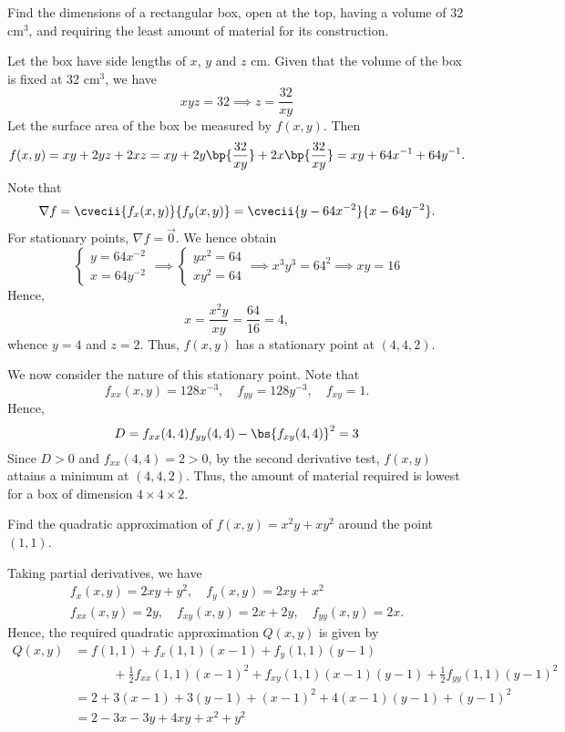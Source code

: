 \begin{problem}
    Find the dimensions of a rectangular box, open at the top, having a volume of 32 cm$^3$, and requiring the least amount of material for its construction.
\end{problem}
\begin{solution}
    Let the box have side lengths of $x$, $y$ and $z$ cm. Given that the volume of the box is fixed at 32 cm$^3$, we have \[xyz = 32 \implies z = \frac{32}{xy}\] Let the surface area of the box be measured by $f(x, y)$. Then \[f(x, y) = xy + 2yz + 2xz = xy + 2y\bp{\frac{32}{xy}} + 2x\bp{\frac{32}{xy}} = xy + 64x^{-1} + 64y^{-1}.\] Note that \[\nabla f = \cvecii{f_x(x, y)}{f_y(x, y)} = \cvecii{y-64x^{-2}}{x - 64y^{-2}}.\] For stationary points, $\nabla f = \vec 0$. We hence obtain
    \[
        \begin{cases}
            y = 64x^{-2}\\
            x = 64y^{-2}
        \end{cases} \implies
        \begin{cases}
            yx^2 = 64\\
            xy^2 = 64
        \end{cases}
        \implies x^3y^3 = 64^2 \implies xy = 16
    \]
    Hence, \[x = \frac{x^2y}{xy} = \frac{64}{16} = 4,\] whence $y = 4$ and $z = 2$. Thus, $f(x, y)$ has a stationary point at $(4, 4, 2)$. 
    
    We now consider the nature of this stationary point. Note that \[f_{xx}(x, y) = 128x^{-3}, \quad f_{yy} = 128y^{-3},\quad f_{xy} = 1.\] Hence, \[D = f_{xx}(4, 4)f_{yy}(4, 4) - \bs{f_{xy}(4, 4)}^2 = 3\] Since $D > 0$ and $f_{xx}(4, 4) = 2 > 0$, by the second derivative test, $f(x, y)$ attains a minimum at $(4, 4, 2)$. Thus, the amount of material required is lowest for a box of dimension $4 \times 4 \times 2$.
\end{solution}

\clearpage
\begin{problem}
    Find the quadratic approximation of $f(x, y) = x^2 y + xy^2$ around the point $(1, 1)$.
\end{problem}
\begin{solution}
    Taking partial derivatives, we have
    \begin{gather*}
        f_x(x, y) = 2xy + y^2, \quad f_y(x, y) = 2xy + x^2\\
        f_{xx}(x, y) = 2y, \quad f_{xy}(x, y) = 2x + 2y, \quad f_{yy}(x, y) = 2x.
    \end{gather*}
    Hence, the required quadratic approximation $Q(x, y)$ is given by
    \begin{align*}
        Q(x, y) &= f(1, 1) + f_x(1, 1)(x-1) + f_y(1, 1)(y-1)\\
        & \hspace{3em} + \frac12 f_{xx}(1, 1)(x-1)^2 + f_{xy}(1, 1)(x-1)(y-1) + \frac12 f_{yy}(1, 1)(y-1)^2\\
        &= 2 + 3(x - 1) + 3(y - 1) + (x-1)^2 + 4(x-1)(y-1) + (y-1)^2\\
        &= 2 - 3x - 3y + 4xy + x^2 + y^2
    \end{align*}
\end{solution}